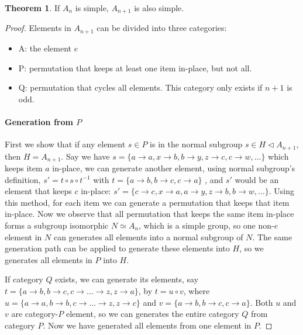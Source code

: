 \documentclass[]{article}
\theoremstyle{definition}\newtheorem{theorem}{Theorem}
\begin{document}
\begin{theorem}
	If $A_n$ is simple, $A_{n+1}$ is also simple.
\end{theorem}
\begin{proof}
Elements in $A_{n+1}$ can be divided into three categories:
\begin{itemize}
	\item A: the element $e$
	\item P: permutation that keeps at least one item in-place, but not all.
	\item Q: permutation that cycles all elements. This category only exists if $n+1$ is odd.
\end{itemize}

\paragraph{Generation from $P$} First we show that if any element $s \in P$ is in the normal subgroup $s \in H\triangleleft A_{n+1}$, then $H = A_{n+1}$. Say we have $s = \{a\rightarrow a, x\rightarrow b, b\rightarrow y, z\rightarrow c, c\rightarrow w, \dots\}$ which keeps item $a$ in-place, we can generate another element, using normal subgroup's definition, $s' = t\circ s \circ t^{-1}$ with $t = \{a\rightarrow b, b\rightarrow c, c\rightarrow a\}$ , and $s'$ would be an element that keeps $c$ in-place: $s' = \{c\rightarrow c,  x\rightarrow a, a\rightarrow y,z\rightarrow b, b\rightarrow w,\dots\}$. Using this method, for each item we can generate a permutation that keeps that item in-place. Now we observe that all permutation that keeps the same item in-place forms a subgroup isomorphic $N \simeq 
A_n$, which is a simple group, so one non-$e$ element in $N$ can generates all elements into a normal subgroup of $N$. The same generation path can be applied to generate these elements into $H$, so we generates all elements in $P$ into $H$.

If category $Q$ exists, we can generate its elements, say $t = \{a\rightarrow b, b\rightarrow c,c\rightarrow\dots\rightarrow z,z\rightarrow a\}$, by $t = u\circ v$, where $u = \{a\rightarrow a,b\rightarrow b,c\rightarrow\dots\rightarrow z,z\rightarrow c\}$ and $v = \{a\rightarrow b, b\rightarrow c, c\rightarrow a\}$. Both $u$ and $v$ are category-$P$ element, so we can generates the entire category $Q$ from category $P$. Now we have generated all elements from one element in $P$.


\end{proof}
\end{document}
